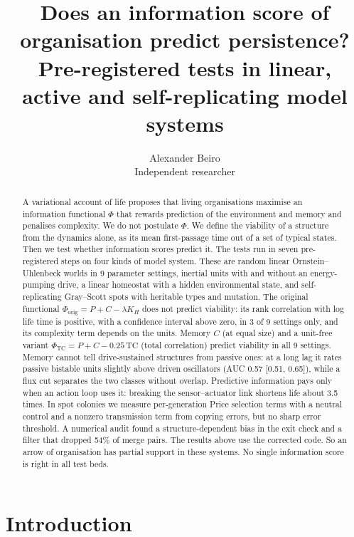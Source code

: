 \documentclass[11pt]{article}
\title{Does an information score of organisation predict persistence?\\
Pre-registered tests in linear, active and self-replicating model systems}
\author{Alexander Beiro\\ \small Independent researcher}
\date{}
\newcommand{\Phiorig}{\Phi_{\mathrm{orig}}}
\newcommand{\PhiTC}{\Phi_{\mathrm{TC}}}
\newcommand{\TC}{\mathrm{TC}}
\begin{document}
\maketitle

\begin{abstract}
A variational account of life proposes that living organisations maximise an information functional $\Phi$ that
rewards prediction of the environment and memory and penalises complexity. We do not postulate $\Phi$. We define the viability of a structure from the dynamics alone, as its mean first-passage time out of a set of
typical states. Then we test whether information scores predict it. The tests run in seven pre-registered steps on four kinds of model system. These are random linear Ornstein--Uhlenbeck worlds in 9 parameter settings, inertial units
with and without an energy-pumping drive, a linear homeostat with a hidden environmental state, and self-replicating
Gray--Scott spots with heritable types and mutation. The original functional $\Phiorig = P + C - \lambda K_H$ does not
predict viability: its rank correlation with log life time is positive, with a confidence interval above zero, in 3 of 9
settings only, and its complexity term depends on the units. Memory $C$ (at equal size) and a unit-free variant
$\PhiTC = P + C - 0.25\,\TC$ (total correlation) predict viability in all 9 settings. Memory cannot tell
drive-sustained structures from passive ones: at a long lag it rates passive bistable units slightly above driven
oscillators (AUC 0.57 [0.51, 0.65]), while a flux cut separates the two classes without overlap. Predictive information
pays only when an action loop uses it: breaking the sensor--actuator link shortens life about 3.5 times. In spot colonies
we measure per-generation Price selection terms with a neutral control and a nonzero transmission term from copying
errors, but no sharp error threshold. A numerical audit found a structure-dependent bias in the exit check and a filter
that dropped 54\% of merge pairs. The results above use the corrected code.
So an arrow of organisation has partial support in these systems. No single information score is right in all test beds.
\end{abstract}

\section{Introduction}
\end{document}
